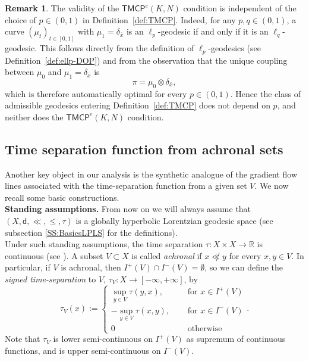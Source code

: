 \documentclass[a4paper,10pt]{article}
\newcommand{\R}{\mathbb{R}}
\newcommand{\sfd}{\mathsf d}
\theoremstyle{plain}
\theoremstyle{definition}
\newtheorem{remark}[lemma]{Remark}
\numberwithin{equation}{section}
\begin{document}
\begin{remark}
The validity of the $\mathsf{TMCP}^{e}(K,N)$ condition is independent of the choice of $p\in(0,1)$ in Definition~\ref{def:TMCP}. Indeed, for any $p,q\in(0,1)$, a curve $(\mu_t)_{t\in[0,1]}$ with $\mu_1=\delta_{\bar{x}}$ is an $\ell_p$-geodesic if and only if it is an $\ell_q$-geodesic. This follows directly from the definition of $\ell_p$-geodesics (see Definition~\ref{def:ellp-DOP}) and from the observation that the unique coupling between $\mu_0$ and $\mu_1=\delta_{\bar{x}}$ is
$$
\pi=\mu_0\otimes\delta_{\bar{x}},
$$
which is therefore automatically optimal for every $p\in(0,1)$. Hence the class of admissible geodesics entering Definition~\ref{def:TMCP} does not depend on $p$, and neither does the $\mathsf{TMCP}^{e}(K,N)$ condition.
\end{remark}





\subsection{Time separation function from achronal sets}

Another key object in our analysis is the synthetic analogue of the gradient flow lines associated with the time-separation function from a given set $V$. 
We now recall some basic constructions.
\\

\textbf{Standing assumptions.} From now on we will always assume that $(X,\sfd, \ll, \leq, \tau)$ is a globally hyperbolic Lorentzian geodesic space (see subsection \ref{SS:BasicsLPLS} for the definitions).  
 \\

Under such standing assumptions, the time separation $\tau:X\times X\to \R$ is continuous (see \cite[Theorem 3.28]{KS}). A subset $V\subset X$ is called \emph{achronal} if $x\not \ll y$ for every $x,y\in V$. In particular, if $V$ is achronal, then $I^{+}(V)\cap I^{-}(V)= \emptyset$, so we can define the \emph{signed time-separation} to $V$, $\tau_{V}:X\to [-\infty, +\infty]$, by
%
\begin{equation}\label{eq:deftauV}
\tau_{V}(x):=
\begin{cases}
\sup_{y\in V} \tau(y,x), &\quad \text{ for }x\in I^{+}(V)\\
-\sup_{y\in V} \tau(x,y),& \quad \text{ for }x\in I^{-}(V) \\
0 &\quad \text{ otherwise}
\end{cases}.
\end{equation}
%
Note that $\tau_{V}$ is lower semi-continuous on $I^{+}(V)$ as supremum of continuous functions, 
and is upper semi-continuous on  $I^{-}(V)$.
\end{document}
